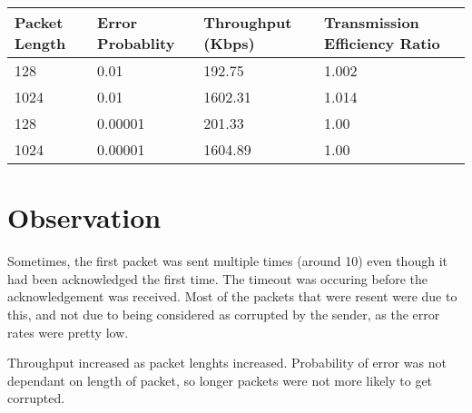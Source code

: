 \documentclass[11pt]{article}
\begin{document}
\begin{tabular} {l l l l }
Packet Length & Error Probablity & Throughput (Kbps) & Transmission Efficiency Ratio\\ \hline
128 & 0.01 & 192.75 & 1.002\\
1024 & 0.01 & 1602.31 & 1.014\\
128 & 0.00001 & 201.33 & 1.00\\
1024 & 0.00001 & 1604.89 & 1.00\\
\end{tabular}


\section{Observation}
Sometimes, the first packet was sent multiple times (around 10)
even though it had been acknowledged the first time. The timeout was occuring
before the acknowledgement was received. Most of the packets that were resent were
due to this, and not due to being considered as corrupted by the sender, as the error 
rates were pretty low.

Throughput increased as packet lenghts increased. Probability of error was not 
dependant on length of packet, so longer packets were not more likely to get corrupted.
\end{document}
